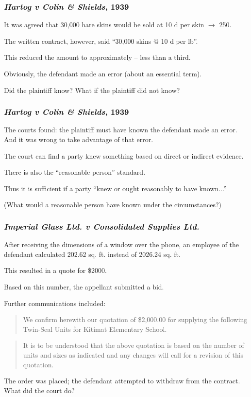 \begin{frame}
\frametitle{\textit{Hartog v Colin \& Shields}, 1939}

It was agreed that 30,000 hare skins would be sold at 10 d per skin $\rightarrow$  250.

The written contract, however, said ``30,000 skins @ 10 d per lb''.

This reduced the amount to approximately  -- less than a third.

Obviously, the defendant made an error (about an essential term). 

Did the plaintiff know? What if the plaintiff did not know?

\end{frame}


\begin{frame}
\frametitle{\textit{Hartog v Colin \& Shields}, 1939}

The courts found: the plaintiff must have known the defendant made an error.\\
\quad And it was wrong to take advantage of that error.

The court can find a party knew something based on direct or indirect evidence.

There is also the ``reasonable person'' standard.

Thus it is sufficient if a party ``knew or ought reasonably to have known...''

(What would a reasonable person have known under the circumstances?)

\end{frame}


\begin{frame}
\frametitle{\textit{Imperial Glass Ltd. v Consolidated Supplies Ltd.}}

After receiving the dimensions of a window over the phone, an employee of the defendant calculated 202.62 sq. ft. instead of 2026.24 sq. ft. 

This resulted in a quote for \$2000.

Based on this number, the appellant submitted a bid.

Further communications included:

\begin{quote}
		We confirm herewith our quotation of \$2,000.00 for supplying the 	following Twin-Seal Units for Kitimat Elementary School.
\end{quote}

\begin{quote}
		It is to be understood that the above quotation is based on the 	number of units and sizes as indicated and any changes will call for 	a revision of this quotation.
\end{quote}

The order was placed; the defendant attempted to withdraw from the contract.\\
\quad What did the court do?

\end{frame}




